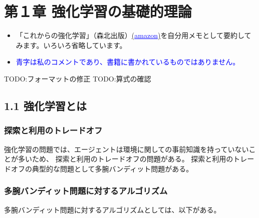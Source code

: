 \documentclass[]{jarticle}
\begin{document}
	
\section*{第１章 強化学習の基礎的理論}

\begin{itemize}
	\item 「これからの強化学習」（森北出版）\href{https://www.amazon.co.jp/dp/4627880316}{(\textcolor{blue}{\underline{amazon}})}を自分用メモとして要約してみます。いろいろ省略しています。
	\item \textcolor{blue}{青字は私のコメントであり、書籍に書かれているものではありません。}
\end{itemize}

TODO:フォーマットの修正 
TODO:算式の確認

\subsection*{1.1 強化学習とは}

\subsubsection*{探索と利用のトレードオフ}

強化学習の問題では、エージェントは環境に関しての事前知識を持っていないことが多いため、
探索と利用のトレードオフの問題がある。
探索と利用のトレードオフの典型的な問題として多腕バンディット問題がある。

\subsubsection*{多腕バンディット問題に対するアルゴリズム}
多腕バンディット問題に対するアルゴリズムとしては、以下がある。
\end{document}
